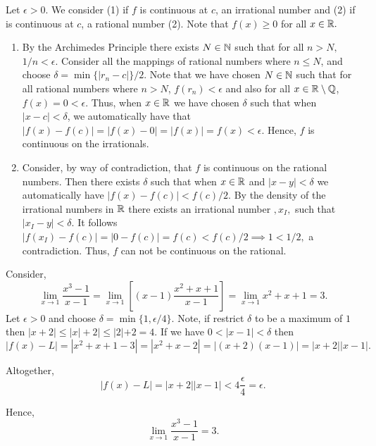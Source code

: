 \documentclass{report}
\begin{document}
\begin{myproof}

  Let $\epsilon > 0.$ We consider (1) if $f$ is continuous at $c$, an irrational number and (2) if is continuous at $c$, a rational number (2). Note that $f(x) \geq0 $ for all $x \in \RR.$

  \begin{enumerate}
    \item 
  By the Archimedes Principle there exists $N \in \NN$ such that for all $n>N,$ $1/n < \epsilon.$ Consider all the mappings of rational numbers where $n\leq N$, and choose $\delta = \min\{|r_n - c|\}/2$.  Note that we have chosen $N\in\NN$ such that for all rational numbers where $n>N$, $f(r_n)< \epsilon$ and also for all $x \in \RR \setminus \QQ$, $f(x)=0< \epsilon.$ Thus, when $x\in \RR$ we have chosen $\delta$ such that when $|x-c|< \delta$, we automatically have that $|f(x) - f(c)|= |f(x) - 0| = |f(x)| = f(x)<\epsilon.$ Hence, $f$ is continuous on the irrationals.
\item Consider, by way of contradiction, that $f$ is continuous on the rational numbers. Then there exists $\delta$ such that when $x\in \RR$ and $|x-y| <\delta$ we automatically have $|f(x) - f(c)| < f(c)/2.$ By the density of the irrational numbers in $\RR$ there exists an irrational number $,x_I,$ such that $|x_I - y| < \delta.$ It follows $|f(x_I) - f(c)|= |0 - f(c)| = f(c) < f(c)/2 \implies 1 < 1/2,$ a contradiction. Thus, $f$ can not be continuous on the rational.
      
  \end{enumerate}

    
\end{myproof}

\begin{myproof}
  Consider,
  $$ \lim _{x \rightarrow 1} \frac{x^3-1}{x-1}= \lim _{x \rightarrow 1}\left[ (x-1)\frac{x^2+x+1}{x-1}\right]= \lim _{x \rightarrow 1}x^2+x+1 = 3.$$ Let $\epsilon >0$ and choose $\delta = \min\{1,\epsilon/4\}$. Note, if restrict $\delta$ to be a maximum of $1$ then $|x+2| \leq |x| + 2 | \leq |2| + 2 = 4.$
 If we have $0<|x-1| < \delta$ then $$|f(x) - L|= |x^2 +x +1 - 3| = |x^2 +x- 2|= |(x+2)(x-1)| = |x+2||x-1|.$$


Altogether, $$|f(x) - L| = |x+2||x-1|<4  \frac{\epsilon}{4}= \epsilon.$$

Hence, 
$$\lim _{x \rightarrow 1} \frac{x^3-1}{x-1}=3.$$

\end{myproof}
\end{document}
